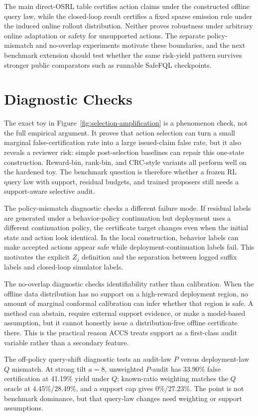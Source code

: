 \documentclass[letterpaper]{article}
\begin{document}
The main direct-OSRL table certifies action claims under the constructed
offline query law, while the closed-loop result certifies a fixed sparse
emission rule under the induced online rollout distribution. Neither proves
robustness under arbitrary online adaptation or safety for unsupported actions.
The separate policy-mismatch and no-overlap experiments motivate these
boundaries, and the next benchmark extension should test whether the same
risk-yield pattern survives stronger public comparators such as runnable
SafeFQL checkpoints.

\section{Diagnostic Checks}

The exact toy in Figure~\ref{fig:selection-amplification} is a phenomenon
check, not the full empirical argument. It proves that action selection can
turn a small marginal false-certification rate into a large issued-claim false
rate, but it also reveals a reviewer risk: simple post-selection baselines can
repair this one-state construction. Reward-bin, rank-bin, and CRC-style
variants all perform well on the hardened toy. The benchmark question is
therefore whether a frozen RL query law with support, residual budgets, and
trained proposers still needs a support-aware selective audit.

The policy-mismatch diagnostic checks a different failure mode. If residual
labels are generated under a behavior-policy continuation but deployment uses a
different continuation policy, the certificate target changes even when the
initial state and action look identical. In the local construction, behavior
labels can make accepted actions appear safe while deployment-continuation
labels fail. This motivates the explicit $Z_j$ definition and the separation
between logged suffix labels and closed-loop simulator labels.

The no-overlap diagnostic checks identifiability rather than calibration. When
the offline data distribution has no support on a high-reward deployment
region, no amount of marginal conformal calibration can infer whether that
region is safe. A method can abstain, require external support evidence, or
make a model-based assumption, but it cannot honestly issue a distribution-free
offline certificate there. This is the practical reason ACCS treats support as
a first-class audit variable rather than a secondary feature.

The off-policy query-shift diagnostic tests an audit-law $P$ versus
deployment-law $Q$ mismatch. At strong tilt $a=8$, unweighted $P$-audit has
33.90\% false certification at 41.19\% yield under $Q$; known-ratio weighting
matches the $Q$ oracle at 4.45\%/28.49\%, and a support cap gives
0\%/27.23\%. The point is not benchmark dominance, but that query-law changes
need weighting or support assumptions.
\end{document}
